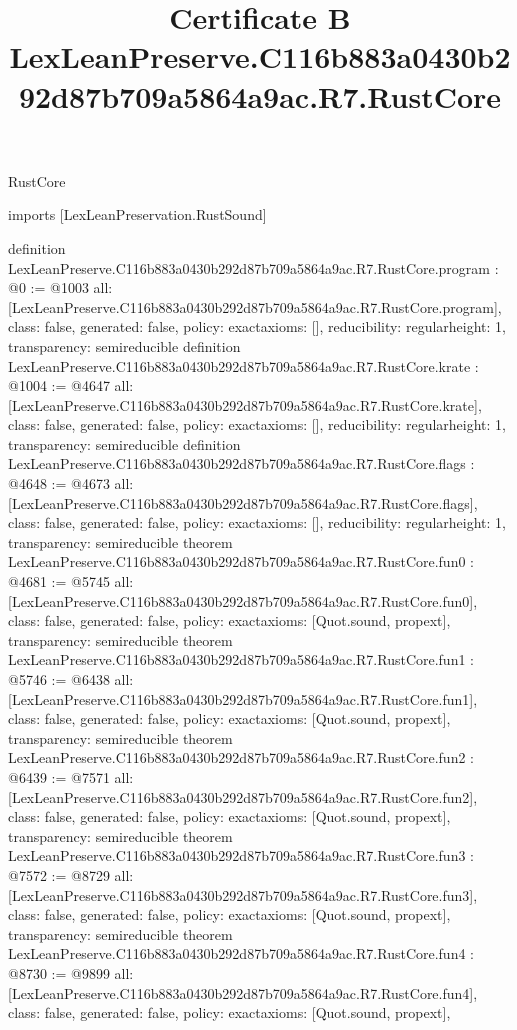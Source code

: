 \begin{lexlean}{RustCore}
\title{Certificate B LexLeanPreserve.C116b883a0430b292d87b709a5864a9ac.R7.RustCore}
\begin{coremodule}
imports [LexLeanPreservation.RustSound]

definition LexLeanPreserve.C116b883a0430b292d87b709a5864a9ac.R7.RustCore.program : @0 := @1003 {
  all: [LexLeanPreserve.C116b883a0430b292d87b709a5864a9ac.R7.RustCore.program],
  class: false,
  generated: false,
  policy: exact{axioms: []},
  reducibility: regular{height: 1},
  transparency: semireducible
}
definition LexLeanPreserve.C116b883a0430b292d87b709a5864a9ac.R7.RustCore.krate : @1004 := @4647 {
  all: [LexLeanPreserve.C116b883a0430b292d87b709a5864a9ac.R7.RustCore.krate],
  class: false,
  generated: false,
  policy: exact{axioms: []},
  reducibility: regular{height: 1},
  transparency: semireducible
}
definition LexLeanPreserve.C116b883a0430b292d87b709a5864a9ac.R7.RustCore.flags : @4648 := @4673 {
  all: [LexLeanPreserve.C116b883a0430b292d87b709a5864a9ac.R7.RustCore.flags],
  class: false,
  generated: false,
  policy: exact{axioms: []},
  reducibility: regular{height: 1},
  transparency: semireducible
}
theorem LexLeanPreserve.C116b883a0430b292d87b709a5864a9ac.R7.RustCore.fun0 : @4681 := @5745 {
  all: [LexLeanPreserve.C116b883a0430b292d87b709a5864a9ac.R7.RustCore.fun0],
  class: false,
  generated: false,
  policy: exact{axioms: [Quot.sound, propext]},
  transparency: semireducible
}
theorem LexLeanPreserve.C116b883a0430b292d87b709a5864a9ac.R7.RustCore.fun1 : @5746 := @6438 {
  all: [LexLeanPreserve.C116b883a0430b292d87b709a5864a9ac.R7.RustCore.fun1],
  class: false,
  generated: false,
  policy: exact{axioms: [Quot.sound, propext]},
  transparency: semireducible
}
theorem LexLeanPreserve.C116b883a0430b292d87b709a5864a9ac.R7.RustCore.fun2 : @6439 := @7571 {
  all: [LexLeanPreserve.C116b883a0430b292d87b709a5864a9ac.R7.RustCore.fun2],
  class: false,
  generated: false,
  policy: exact{axioms: [Quot.sound, propext]},
  transparency: semireducible
}
theorem LexLeanPreserve.C116b883a0430b292d87b709a5864a9ac.R7.RustCore.fun3 : @7572 := @8729 {
  all: [LexLeanPreserve.C116b883a0430b292d87b709a5864a9ac.R7.RustCore.fun3],
  class: false,
  generated: false,
  policy: exact{axioms: [Quot.sound, propext]},
  transparency: semireducible
}
theorem LexLeanPreserve.C116b883a0430b292d87b709a5864a9ac.R7.RustCore.fun4 : @8730 := @9899 {
  all: [LexLeanPreserve.C116b883a0430b292d87b709a5864a9ac.R7.RustCore.fun4],
  class: false,
  generated: false,
  policy: exact{axioms: [Quot.sound, propext]},
}
\end{coremodule}
\end{lexlean}
